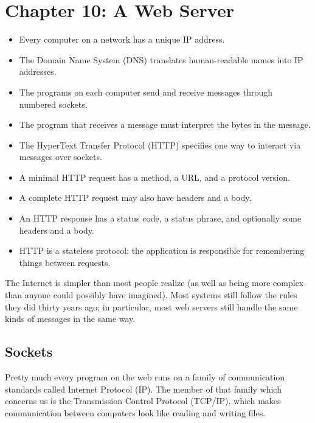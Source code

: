 \documentclass{scrbook}
\begin{document}
\chapter{Chapter 10: A Web Server}\label{server}

\begin{itemize}

\item Every computer on a network has a unique IP address.

\item The Domain Name System (DNS) translates human-readable names into IP addresses.

\item The programs on each computer send and receive messages through numbered sockets.

\item The program that receives a message must interpret the bytes in the message.

\item The HyperText Transfer Protocol (HTTP) specifies one way to interact via messages over sockets.

\item A minimal HTTP request has a method, a URL, and a protocol version.

\item A complete HTTP request may also have headers and a body.

\item An HTTP response has a status code, a status phrase, and optionally some headers and a body.

\item HTTP is a stateless protocol: the application is responsible for remembering things between requests.

\end{itemize}


The Internet is simpler than most people realize
(as well as being more complex than anyone could possibly have imagined).
Most systems still follow the rules they did thirty years ago;
in particular,
most web servers still handle the same kinds of messages in the same way.

\section{Sockets}\label{server-sockets}


Pretty much every program on the web
runs on a family of communication standards called Internet Protocol (IP).
The member of that family which concerns us is the Transmission Control Protocol (TCP/IP),
which makes communication between computers look like reading and writing files.
\end{document}
